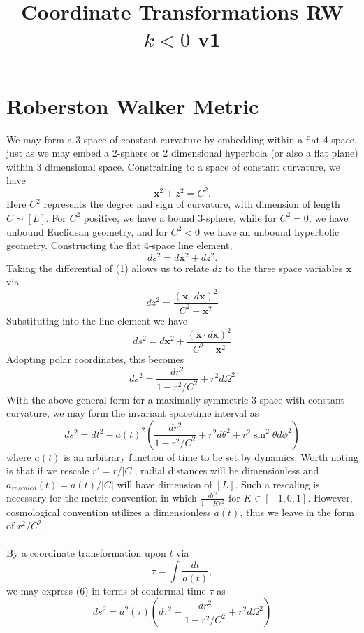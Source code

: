 \documentclass[10pt,letterpaper]{article}
\title{Coordinate Transformations RW $k<0$ v1 }
\date{}
\newcommand{\vect}[1]{\mathbf{#1}}
\begin{document}
\maketitle
\noindent 
\section*{Roberston Walker Metric}
We may form a 3-space of constant curvature by embedding within a flat 4-space, just as we may embed a 2-sphere or 2 dimensional hyperbola (or also a flat plane) within 3 dimensional space. Constraining to a space of constant curvature, we have
\begin{equation}
\vect x^2 +z^2 = C^2.
\end{equation}
Here $C^2$ represents the degree and sign of curvature, with dimension of length $C \sim [L]$. For $C^2$ positive, we have a bound 3-sphere, while for $C^2 =0$, we have unbound Euclidean geometry, and for $C^2 <0$ we have an unbound hyperbolic geometry. Constructing the flat 4-space line element,
\begin{equation}
ds^2 = d\vect x^2 + dz^2.
\end{equation}
Taking the differential of (1) allows us to relate $dz$ to the three space variables $\vect x$ via
\begin{equation}
dz^2 = \frac{ (\vect x\cdot d \vect x)^2}{C^2-\vect x^2}
\end{equation}
Substituting into the line element we have
\begin{equation}
	ds^2 = d\vect x^2 +   \frac{ (\vect x\cdot d \vect x)^2}{C^2-\vect x^2}
\end{equation}
Adopting polar coordinates, this becomes
\begin{equation}
 ds^2 = \frac{dr^2}{1-r^2/C^2} + r^2 d\Omega^2
\end{equation}
With the above general form for a maximally symmetric 3-space with constant curvature, we may form the invariant spacetime interval as 
\begin{equation}
ds^2 = dt^2 - a(t)^2 \left(  \frac{dr^2}{1-r^2/C^2} + r^2 d\theta^2 + r^2\sin^2\theta d\phi^2 \right)
\end{equation}
where $a(t)$ is an arbitrary function of time to be set by dynamics. Worth noting is that if we rescale $r' = r/|C|$, radial distances will be dimensionless and $a_{rescaled}(t) = a(t)/|C|$ will have dimension of $[L]$. Such a rescaling is necessary for the metric convention in which $\frac{dr^2}{1-Kr^2}$ for $K \in [-1,0,1]$. However, cosmological convention utilizes a dimensionless $a(t)$, thus we leave in the form of $r^2/C^2$. 
\\ \\
By a coordinate transformation upon $t$ via
\begin{equation}
\tau = \int \frac{dt}{a(t)},
\end{equation}
we may express (6) in terms of conformal time $\tau$ as 
\begin{equation}
ds^2 = a^2(\tau) \left ( d\tau^2 - \frac{dr^2}{1-r^2/C^2} + r^2 d\Omega^2 \right)
\end{equation}
\end{document}
